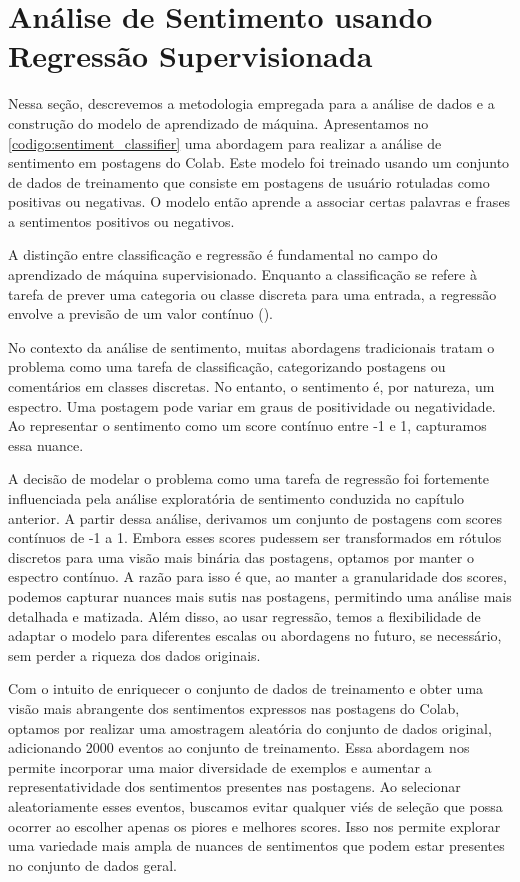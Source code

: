 \section{Análise de Sentimento usando Regressão Supervisionada}

Nessa seção, descrevemos a metodologia empregada para a análise de dados e a construção do modelo de aprendizado de máquina. Apresentamos no \autoref{codigo:sentiment_classifier} uma abordagem para realizar a análise de sentimento em postagens do Colab. Este modelo foi treinado usando um conjunto de dados de treinamento que consiste em postagens de usuário rotuladas como positivas ou negativas. O modelo então aprende a associar certas palavras e frases a sentimentos positivos ou negativos.

A distinção entre classificação e regressão é fundamental no campo do aprendizado de máquina supervisionado. Enquanto a classificação se refere à tarefa de prever uma categoria ou classe discreta para uma entrada, a regressão envolve a previsão de um valor contínuo ().

No contexto da análise de sentimento, muitas abordagens tradicionais tratam o problema como uma tarefa de classificação, categorizando postagens ou comentários em classes discretas. No entanto, o sentimento é, por natureza, um espectro. Uma postagem pode variar em graus de positividade ou negatividade. Ao representar o sentimento como um score contínuo entre -1 e 1, capturamos essa nuance.

A decisão de modelar o problema como uma tarefa de regressão foi fortemente influenciada pela análise exploratória de sentimento conduzida no capítulo anterior. A partir dessa análise, derivamos um conjunto de postagens com scores contínuos de -1 a 1. Embora esses scores pudessem ser transformados em rótulos discretos para uma visão mais binária das postagens, optamos por manter o espectro contínuo. A razão para isso é que, ao manter a granularidade dos scores, podemos capturar nuances mais sutis nas postagens, permitindo uma análise mais detalhada e matizada. Além disso, ao usar regressão, temos a flexibilidade de adaptar o modelo para diferentes escalas ou abordagens no futuro, se necessário, sem perder a riqueza dos dados originais.

Com o intuito de enriquecer o conjunto de dados de treinamento e obter uma visão mais abrangente dos sentimentos expressos nas postagens do Colab, optamos por realizar uma amostragem aleatória do conjunto de dados original, adicionando 2000 eventos ao conjunto de treinamento. Essa abordagem nos permite incorporar uma maior diversidade de exemplos e aumentar a representatividade dos sentimentos presentes nas postagens. Ao selecionar aleatoriamente esses eventos, buscamos evitar qualquer viés de seleção que possa ocorrer ao escolher apenas os piores e melhores scores. Isso nos permite explorar uma variedade mais ampla de nuances de sentimentos que podem estar presentes no conjunto de dados geral.

